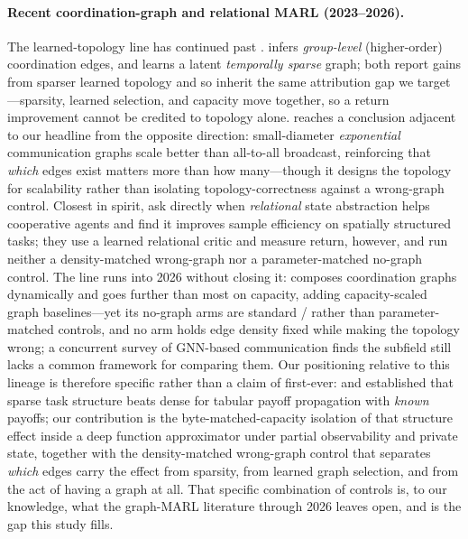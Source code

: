 \paragraph{Recent coordination-graph and relational MARL (2023--2026).} The
learned-topology line has continued past . 
\citep{duan_2024_gacg} infers \emph{group-level} (higher-order) coordination
edges, and  \citep{duan_2024_ltscg} learns a latent
\emph{temporally sparse} graph; both report gains from sparser learned topology
and so inherit the same attribution gap we target---sparsity, learned selection,
and capacity move together, so a return improvement cannot be credited to
topology alone.  \citep{li_2025_expocomm} reaches a conclusion
adjacent to our headline from the opposite direction: small-diameter
\emph{exponential} communication graphs scale better than all-to-all broadcast,
reinforcing that \emph{which} edges exist matters more than how many---though it
designs the topology for scalability rather than isolating topology-correctness
against a wrong-graph control. Closest in spirit,
\citet{utke_2025_relabstraction} ask directly when \emph{relational} state
abstraction helps cooperative agents and find it improves sample efficiency on
spatially structured tasks; they use a learned relational critic and measure
return, however, and run neither a density-matched wrong-graph nor a
parameter-matched no-graph control. The line runs into 2026 without closing it:
 \citep{gupta_2026_dmcg} composes coordination graphs dynamically
and goes further than most on capacity, adding capacity-scaled graph
baselines---yet its no-graph arms are standard /
rather than parameter-matched controls, and no arm holds edge density fixed while
making the topology wrong; a concurrent survey of GNN-based communication
\citep{cuzinrambaud_2026_survey} finds the subfield still lacks a common
framework for comparing them. Our positioning relative to this lineage is
therefore specific rather than a claim of first-ever: \citet{kok_2004_sparseq}
and \citet{kok_2006_payoffprop} established that sparse task structure beats
dense for tabular payoff propagation with \emph{known} payoffs; our contribution
is the byte-matched-capacity isolation of that structure effect inside a deep
function approximator under partial observability and private state, together
with the density-matched wrong-graph control that separates \emph{which} edges
carry the effect from sparsity, from learned graph selection, and from the act
of having a graph at all. That specific combination of controls is, to our
knowledge, what the graph-MARL literature through 2026 leaves open, and is the
gap this study fills.

